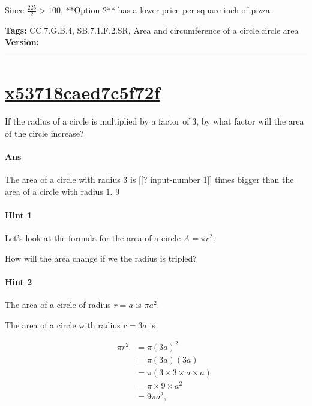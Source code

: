 \documentclass[twocolumn,10pt]{article}
\begin{document}
Since $\frac{225}{2} > 100$, **Option 2** has a lower price per square inch of pizza.



\medskip
\noindent
\textbf{Tags:} {\footnotesize CC.7.G.B.4, SB.7.1.F.2.SR, Area and circumference of a circle.circle area}\\
\textbf{Version:} \DIFdelbegin {}\DIFdelend \DIFaddbegin {}\DIFaddend \smallskip\hrule





\section{\href{https://www.khanacademy.org/devadmin/content/items/x53718caed7c5f72f}{x53718caed7c5f72f}}

\noindent
If the radius of a circle is multiplied by a factor of $3$, by what factor will the area of the circle increase?

\paragraph{Ans} The area of a circle with radius $3$ is [[? input-number 1]] times bigger than the area of a circle with radius $1$.  9

\paragraph{Hint 1}Let's look at the formula for the area of a circle $A=\pi r^2$.  

How will the area change if we the radius is tripled?

\paragraph{Hint 2}The area of a circle of radius $r=a$ is $\pi a^2$.

The area of a circle with radius $r=3a$ is 

\begin{align*}
\qquad 
 \pi r^2 & =\pi (3a)^2  \\
  & =\pi(3a)(3a) \\
  &=\pi(3 \times 3 \times a \times a)  \\
   &= \pi \times 9 \times a^2 \\
   &= 9\pi a^2,
\end{align*} 
\end{document}
